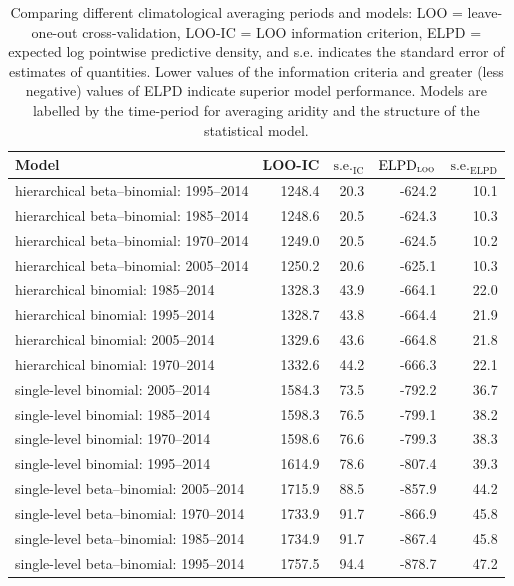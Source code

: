 \documentclass[draft]{agujournal}\usepackage{knitr}
\begin{document}
\begin{table}[H]
\centering
\begingroup\small
\begin{tabular}{p{3in}rrrr}
  \hline
Model & LOO-IC & $\text{s.e.}_{\text{IC}}$ & $\text{ELPD}_{\text{\scshape{loo}}}$ & $\text{s.e.}_{\text{ELPD}}$ \\ 
  \hline
hierarchical beta--binomial: 1995--2014 & 1248.4 & 20.3 & -624.2 & 10.1 \\ 
  hierarchical beta--binomial: 1985--2014 & 1248.6 & 20.5 & -624.3 & 10.3 \\ 
  hierarchical beta--binomial: 1970--2014 & 1249.0 & 20.5 & -624.5 & 10.2 \\ 
  hierarchical beta--binomial: 2005--2014 & 1250.2 & 20.6 & -625.1 & 10.3 \\ 
  hierarchical binomial: 1985--2014 & 1328.3 & 43.9 & -664.1 & 22.0 \\ 
  hierarchical binomial: 1995--2014 & 1328.7 & 43.8 & -664.4 & 21.9 \\ 
  hierarchical binomial: 2005--2014 & 1329.6 & 43.6 & -664.8 & 21.8 \\ 
  hierarchical binomial: 1970--2014 & 1332.6 & 44.2 & -666.3 & 22.1 \\ 
  single-level binomial: 2005--2014 & 1584.3 & 73.5 & -792.2 & 36.7 \\ 
  single-level binomial: 1985--2014 & 1598.3 & 76.5 & -799.1 & 38.2 \\ 
  single-level binomial: 1970--2014 & 1598.6 & 76.6 & -799.3 & 38.3 \\ 
  single-level binomial: 1995--2014 & 1614.9 & 78.6 & -807.4 & 39.3 \\ 
  single-level beta--binomial: 2005--2014 & 1715.9 & 88.5 & -857.9 & 44.2 \\ 
  single-level beta--binomial: 1970--2014 & 1733.9 & 91.7 & -866.9 & 45.8 \\ 
  single-level beta--binomial: 1985--2014 & 1734.9 & 91.7 & -867.4 & 45.8 \\ 
  single-level beta--binomial: 1995--2014 & 1757.5 & 94.4 & -878.7 & 47.2 \\ 
   \hline
\end{tabular}
\endgroup
\caption[Model comparison: LOO (climatological interval).]{Comparing different climatological averaging periods and models: LOO = leave-one-out cross-validation, LOO-IC = LOO information criterion, ELPD = expected log pointwise predictive density, and s.e. indicates the standard error of estimates of quantities. Lower values of the information criteria and greater (less negative) values of ELPD indicate superior model performance. Models are labelled by the time-period for averaging aridity and the structure of the statistical model.} 
\label{tab:loo.years}
\end{table}
\end{document}
